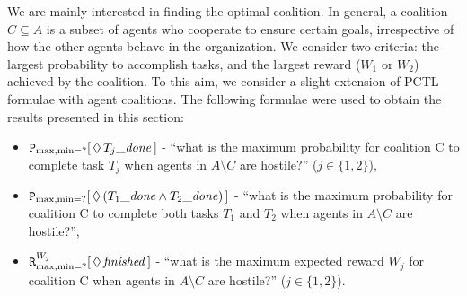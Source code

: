 \documentclass{llncs}
\begin{document}
We are mainly interested in finding the optimal coalition. In general,
a coalition $C{\subseteq}A$ is a subset of agents who cooperate to ensure certain goals, irrespective of how the other agents behave in the organization. We consider two criteria: the largest probability to accomplish tasks, and the largest reward ($W_1$ or $W_2$) achieved by the coalition. To this aim, we consider a slight extension of PCTL formulae with agent coalitions. The following formulae were used to obtain the results presented in this section:
\begin{itemize}
 \item ${\tt P}_{\max,\min=?}[\,\Diamond\,T_{j} \mathit{\_done}\,]$ -
``what is the maximum probability for coalition C to complete task $T_j$ when agents in $A\setminus C$ are hostile?'' ($j\in\{1,2\}$),
 \item ${\tt P}_{\max,\min=?}[\,\Diamond\,(T_{1}\mathit{\_done} \wedge T_2 \mathit{\_done})\,]$ -
``what is the maximum probability for coalition C to complete both tasks $T_1$ and $T_2$ when agents in $A\setminus C$ are hostile?'',
 \item ${\tt R}_{\max,\min=?}^{W_{j}}[\,\Diamond\,\mathit{finished}\,]$ -
``what is the maximum expected reward $W_j$ for coalition C when agents in $A\setminus C$ are hostile?'' ($j\in\{1,2\}$).
\end{itemize}
\end{document}
